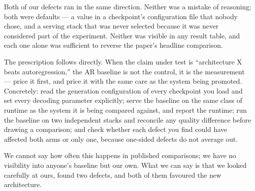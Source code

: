 Both of our defects ran in the same direction. Neither was a mistake of
reasoning; both were defaults --- a value in a checkpoint's configuration file
that nobody chose, and a serving stack that was never selected because it was
never considered part of the experiment. Neither was visible in any result
table, and each one alone was sufficient to reverse the paper's headline
comparison.

The prescription follows directly. When the claim under test is ``architecture
X beats autoregression,'' the AR baseline is not the control, it is the
measurement --- price it first, and price it with the same care as the system
being promoted. Concretely: read the generation configuration of every
checkpoint you load and set every decoding parameter explicitly; serve the
baseline on the same class of runtime as the system it is being compared
against, and report the runtime; run the baseline on two independent stacks and
reconcile any quality difference before drawing a comparison; and check whether
each defect you find could have affected both arms or only one, because
one-sided defects do not average out.

We cannot say how often this happens in published comparisons; we have no
visibility into anyone's baseline but our own. What we can say is that we looked
carefully at ours, found two defects, and both of them favoured the new
architecture.
